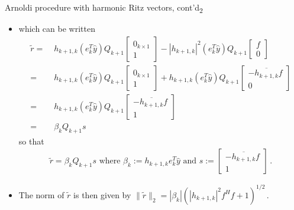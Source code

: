 \documentclass[t,usepdftitle=false]{beamer}
\begin{document}
\begin{frame}{Arnoldi procedure with harmonic Ritz vectors, cont'd\textsubscript{2}}
\begin{itemize}
\item[] which can be written
\begin{align*}
\tilde{r}
=&\;h_{k+1,k}(e_k^T\hat{y})Q_{k+1}\begin{bmatrix}0_{k\times 1}\\1\end{bmatrix}-|h_{k+1,k}|^2(e_k^T\hat{y})Q_{k+1}\begin{bmatrix}f\\0\end{bmatrix}\\
=&\;h_{k+1,k}(e_k^T\hat{y})Q_{k+1}\begin{bmatrix}0_{k\times 1}\\1\end{bmatrix}+h_{k+1,k}(e_k^T\hat{y})Q_{k+1}\begin{bmatrix}-\overline{h_{k+1,k}}f\\0\end{bmatrix}\\
=&\;h_{k+1,k}(e_k^T\hat{y})Q_{k+1}\begin{bmatrix}-\overline{h_{k+1,k}}f\\1\end{bmatrix}\\
=&\;\beta_{k}Q_{k+1}s
\end{align*}
so that\vspace{-.35cm}
\begin{align*}
\boxed{\tilde{r}=\beta_{k}Q_{k+1}s}
\text{  where  }
\boxed{\beta_{k}:=h_{k+1,k}e_k^T\hat{y}}
\text{  and  }
\boxed{s:=\begin{bmatrix}-\overline{h_{k+1,k}}f\\1\end{bmatrix}}\,.
\end{align*}
\item The norm of $\tilde{r}$ is then given by $\boxed{\|\tilde{r}\|_2=|\beta_{k}|(|h_{k+1,k}|^2f^Hf+1)^{1/2}}\,$.
\end{itemize}
\end{frame}
\end{document}
